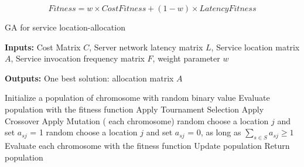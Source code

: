 \documentclass{llncs}
\begin{document}
\begin{equation}
		Fitness = w \times CostFitness + (1 - w) \times LatencyFitness
	\end{equation}


\begin{algorithm}[htb]
	\caption{GA for service location-allocation}
	\textbf{Inputs:}
		Cost Matrix $C$,
		Server network latency matrix $L$, 
		Service location matrix $A$, 
		Service invocation frequency matrix $F$, 
		weight parameter $w$

	\textbf{Outputs:}
		One best solution: allocation matrix $A$


	\begin{algorithmic}[1]
		\State Initialize a population of chromosome with random binary value
		\State Evaluate population with the fitness function
			\State Apply Tournament Selection
			\State Apply Crossover 
			\State Apply Mutation
			\For( each chromosome)
					\State random choose a location $j$ and set $a_{sj}$ = 1
				\EndWhile
					\State random choose a location $j$ and set $a_{sj}$ = 0, as long as $\sum\limits_{s \in S} a_{sj} \geq 1$
				\EndWhile
			\State Evaluate each chromosome with the fitness function
			\EndFor
			\State Update population
			\EndWhile
		\State Return population
	\end{algorithmic}
\end{algorithm}
\end{document}
